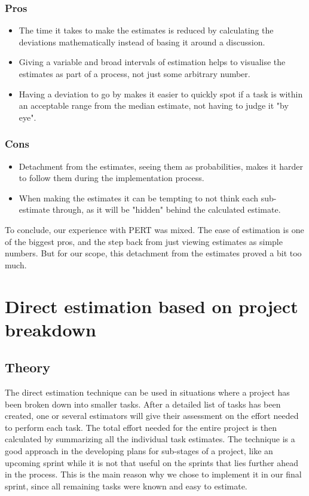 \subsubsection{Pros}
\begin{itemize}
\item The time it takes to make the estimates is reduced by calculating the deviations mathematically instead of basing it around a discussion. 
\item Giving a variable and broad intervals of estimation helps to visualise the estimates as part of a process, not just some arbitrary number.
\item Having a deviation to go by makes it easier to quickly spot if a task is within an acceptable range from the median estimate, not having to judge it "by eye".

\end{itemize}

\subsubsection{Cons}
\begin{itemize}
\item Detachment from the estimates, seeing them as probabilities, makes it harder to follow them during the implementation process.
\item When making the estimates it can be tempting to not think each sub-estimate through, as it will be "hidden" behind the calculated estimate.

\end{itemize}

To conclude, our experience with PERT was mixed. The ease of estimation is one of the biggest pros, and the step back from just viewing estimates as simple numbers. But for our scope, this detachment from the estimates proved a bit too much.

\section{Direct estimation based on project breakdown}
\subsection{Theory}
The direct estimation technique can be used in situations where a project has been broken down into smaller tasks. After a detailed list of tasks has been created, one or several estimators will give their assessment on the effort needed to perform each task. The total effort needed for the entire project is then calculated by summarizing all the individual task estimates.
The technique is a good approach in the developing plans for sub-stages of a project, like an upcoming sprint while it is not that useful on the sprints that lies further ahead in the process. This is the main reason why we chose to implement it in our final sprint, since all remaining tasks were known and easy to estimate.


